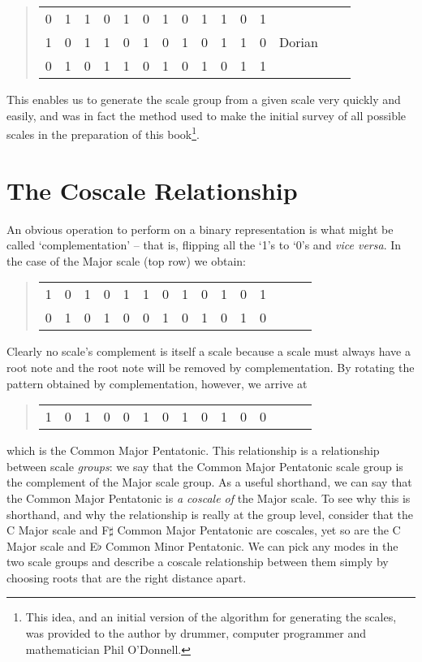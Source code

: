 \documentclass[english]{./gbook}
\begin{document}
\begin{large}
\begin{quote}
\begin{tabular}{rrrrrrrrrrrrrrr}
	0 &1 & 1 & 0 & 1 & 0 & 1 & 0 & 1 & 1 & 0 &1 & \\
	1 & 0 &1 & 1 & 0 & 1 & 0 & 1 & 0 & 1 & 1 & 0 & Dorian \\
	0 &1 & 0 &1 & 1 & 0 & 1 & 0 & 1 & 0 & 1 & 1 & \\
\end{tabular}
\end{quote}
This enables us to generate the scale group from a given scale very quickly and easily, and was in fact the method used to make the initial survey of all possible scales in the preparation of this book\footnote{This idea, and an initial version of the algorithm for generating the scales, was provided to the author by drummer, computer programmer and mathematician Phil O'Donnell.}.

\section{The Coscale Relationship}

An obvious operation to perform on a binary representation is what might be called `complementation' -- that is, flipping all the `1's to `0's and \emph{vice versa}. In the case of the Major scale (top row) we obtain:
\begin{quote}
\begin{tabular}{rrrrrrrrrrrrrrr}
	1 & 0 &1 & 0 &1 & 1 & 0 & 1 & 0 & 1 & 0 & 1 \\
	0 & 1 &0 & 1 &0 & 0 & 1 & 0 & 1 & 0 & 1 & 0 \\
\end{tabular}
\end{quote}
Clearly no scale's complement is itself a scale because a scale must always have a root note and the root note will be removed by complementation. By rotating the pattern obtained by complementation, however, we arrive at
\begin{quote}
\begin{tabular}{rrrrrrrrrrrrrrr}
	1 &0 & 1 &0 & 0 & 1 & 0 & 1 & 0 & 1 & 0 & 0 \\
\end{tabular}
\end{quote}
which is the Common Major Pentatonic. This relationship is a relationship between scale \emph{groups}: we say that the Common Major Pentatonic scale group is the complement of the Major scale group. As a useful shorthand, we can say that the Common Major Pentatonic is \emph{a coscale of} the Major scale. To see why this is shorthand, and why the relationship is really at the group level, consider that the C Major scale and F$\sharp$ Common Major Pentatonic are coscales, yet so are the C Major scale and E$\flat$ Common Minor Pentatonic. We can pick any modes in the two scale groups and describe a coscale relationship between them simply by choosing roots that are the right distance apart.


\end{large}
\end{document}
